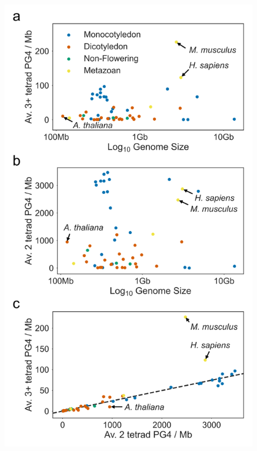 \documentclass[12pt,a4paper,]{report}
\let\origfigure=\figure
\let\endorigfigure=\endfigure
\renewenvironment{figure}[1][2] {
    \expandafter\origfigure\expandafter[H]
} {
    \endorigfigure
}
\begin{document}
\begin{figure}[htbp]
\centering
\includegraphics[width=\textwidth,height=562pt,keepaspectratio]{chapter_4/figures/pg4_density_plant_genomes.png}
\caption[PG4 density of Plant Genomes]{\textbf{PG4   density   of   Plant   Genomes}   \textbf{a)}   and   \textbf{b)}   Scatter   plots   showing   log10   genome   size   vs. the   average   \textbf{a)}   three   tetrad   or   more   and   \textbf{b)}   two   tetrad   PG4   density   per   Megabase   for   22   Monocotyledons,   21   Dicotyledons,   3   Non-flowering   plants   and   4   metazoans.   Plant   genomes   are   much   poorer   in   three   tetrad   PG4s   than   the   metazoans   \textit{H.   sapiens}   and   \textit{M.   musculus} ,   but   have   more   comparable   densities   of   two   tetrad   PG4s.   \textbf{c)}   Scatter   plot   showing   the   relationship   between   three   tetrad   and   two   tetrad   PG4   densities.   \textit{M.   musculus}   and   \textit{H.   sapiens}   do   not   follow   the   same   pattern   of   relative   PG4   densities   as   plants.   \label{pg4_genomes}}
\end{figure}
\end{document}
